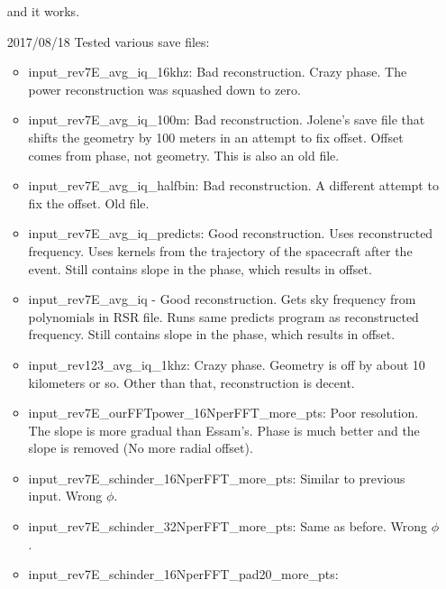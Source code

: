 \documentclass[crop=false,class=article,oneside]{standalone}
\begin{document}
\begin{enumerate}[leftmargin=55pt]
                              and it works.
            \item[2017/08/18] Tested various save files:
            \begin{itemize}
                \item input\_rev7E\_avg\_iq\_16khz: Bad reconstruction.
                      Crazy phase. The power reconstruction was squashed
                      down to zero.
                \item input\_rev7E\_avg\_iq\_100m: Bad reconstruction.
                      Jolene's save file that shifts the geometry by 100
                      meters in an attempt to fix offset. Offset comes
                      from phase, not geometry. This is also an old file.
                \item input\_rev7E\_avg\_iq\_halfbin: Bad reconstruction.
                      A different attempt to fix the offset. Old file.
                \item input\_rev7E\_avg\_iq\_predicts: Good reconstruction.
                      Uses reconstructed frequency. Uses kernels from the
                      trajectory of the spacecraft after the event. Still
                      contains slope in the phase, which results in offset.
                \item input\_rev7E\_avg\_iq - Good reconstruction.
                      Gets sky frequency from polynomials in RSR file.
                      Runs same predicts program as reconstructed frequency.
                      Still contains slope in the phase,
                      which results in offset.
                \item input\_rev123\_avg\_iq\_1khz: Crazy phase.
                      Geometry is off by about 10 kilometers or so.
                      Other than that, reconstruction is decent.
                \item input\_rev7E\_ourFFTpower\_16NperFFT\_more\_pts:
                      Poor resolution. The slope is more gradual than
                      Essam's. Phase is much better and the slope is
                      removed (No more radial offset). 
                \item input\_rev7E\_schinder\_16NperFFT\_more\_pts:
                      Similar to previous input. Wrong $\phi$.
                \item input\_rev7E\_schinder\_32NperFFT\_more\_pts:
                      Same as before. Wrong $\phi$.
                \item input\_rev7E\_schinder\_16NperFFT\_pad20\_more\_pts:

\end{itemize}
\end{enumerate}
\end{document}
